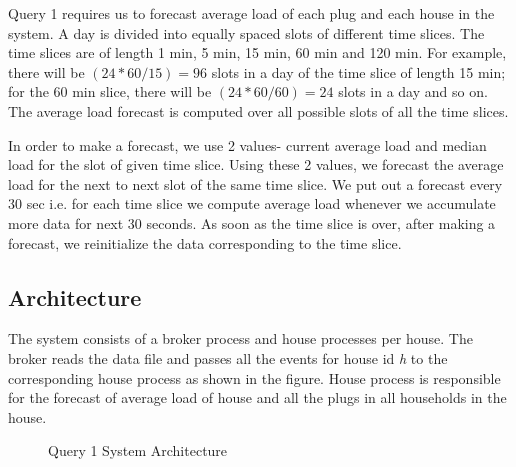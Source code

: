 Query 1 requires us to forecast average load of each plug and each house in the system. A day is divided into equally spaced slots of different time slices. The time slices are of length 1 min, 5 min, 15 min, 60 min and 120 min. For example, there will be $(24*60/15) = 96$ slots in a day of the time slice of length 15 min; for the 60 min slice, there will be $(24*60/60) = 24$ slots in a day and so on. The average load forecast is computed over all possible slots of all the time slices.

In order to make a forecast, we use 2 values- current average load and median load for the slot of given time slice. Using these 2 values, we forecast the average load for the next to next slot of the same time slice. We put out a forecast every 30 sec i.e. for each time slice we compute average load whenever we accumulate more data for next 30 seconds. As soon as the time slice is over, after making a forecast, we reinitialize the data corresponding to the time slice.


\subsection{Architecture}
The system consists of a broker process and house processes per house. The broker reads the data file and passes all the events for house id \textit{h} to the corresponding house process as shown in the figure. House process is responsible for the forecast of average load of house and all the plugs in all households in the house.

\begin{figure}[h]
\begin{center}
\caption{Query 1 System Architecture}
\end{center}
\end{figure}

